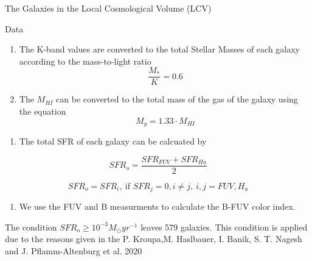 \documentclass[presentation]{beamer}
\begin{document}
\begin{frame}[label={sec:org75f05ef}]{The Galaxies in the Local Cosmological Volume (LCV)}
\begin{block}{Data}
\begin{enumerate}
\item The K-band values are converted to the total Stellar Masses of each galaxy according to the mass-to-light ratio\autocite{lelliSPARCMASSMODELS2016}
$$\frac{M_*}{K}=0.6$$
\item The \(M_{HI}\) can be converted to the total mass of the gas of the galaxy using the equation $$M_g=1.33\cdot M_{HI}$$
\end{enumerate}
\begin{enumerate}
\item The total SFR of each galaxy can be calcuated by
\end{enumerate}

$$
    SFR_o=\frac{SFR_{FUV}+SFR_{Ha}}{2}
$$

$$
    SFR_o=SFR_i,\ \text{if } SFR_j=0,i\neq j,\ i,j=FUV, H_a
$$
\begin{enumerate}
\item We use the FUV and B measurments to calculate the B-FUV color index.
\end{enumerate}

The condition \(SFR_o\geq 10^{-3}M_\odot yr^{-1}\) leaves 579 galaxies. This condition is applied due to the reasons given in the P. Kroupa,M. Haslbauer, I. Banik, S. T. Nagesh and J. Pflamm-Altenburg et al. 2020 \cite{kroupaConstraintsStarFormation2020}
\end{block}
\end{frame}
\end{document}
